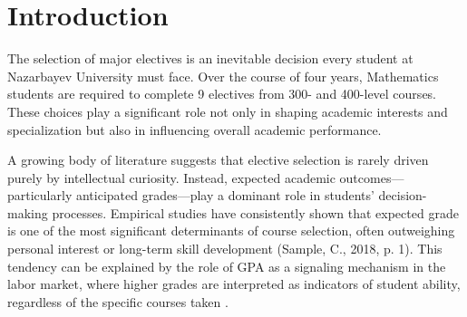 \documentclass[a4paper,12pt,reqno]{amsart}
\numberwithin{equation}{section}
\theoremstyle{plain}
\theoremstyle{definition}
\begin{document}
	
\begin{abstract}
This study examines how Mathematics students at Nazarbayev University can optimize elective course selection to maximize Grade Point Average (GPA) while accounting for academic risk. Prior research suggests that students often prioritize expected grades over personal interest due to the signaling role of GPA in academic and labor market outcomes. Using institutional data on upper-level Mathematics electives, we apply multiple regression models, including Linear, Ridge, Lasso, and Random Forest, to analyze the relationship between course characteristics and GPA. Key factors such as failure rates, withdrawal rates, and grade variability are incorporated into the analysis. To complement predictive modeling, we develop a composite ranking framework that balances expected GPA with risk measures. The findings highlight substantial variation across courses and demonstrate that high-GPA courses may still carry significant risk. The proposed risk-adjusted approach provides a more reliable tool for elective decision-making and illustrates the value of data-driven methods in academic planning.
\end{abstract}
\maketitle
\section{Introduction}
The selection of major electives is an inevitable decision every student at Nazarbayev University must face. Over the course of four years, Mathematics students are required to complete 9 electives from 300- and 400-level courses. These choices play a significant role not only in shaping academic interests and specialization but also in influencing overall academic performance.

A growing body of literature suggests that elective selection is rarely driven purely by intellectual curiosity. Instead, expected academic outcomes—particularly anticipated grades—play a dominant role in students’ decision-making processes. Empirical studies have consistently shown that expected grade is one of the most significant determinants of course selection, often outweighing personal interest or long-term skill development (Sample, C., 2018, p. 1). This tendency can be explained by the role of GPA as a signaling mechanism in the labor market, where higher grades are interpreted as indicators of student ability, regardless of the specific courses taken \parencite[p.~1]{Sample2018}.
\end{document}
